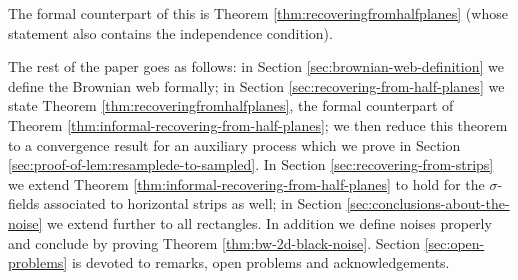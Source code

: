 {The formal counterpart of this is
Theorem \ref{thm:recoveringfromhalfplanes} (whose statement also
contains the independence condition).

The rest of the paper goes as follows: in Section \ref{sec:brownian-web-definition} we define the
Brownian web formally; in Section \ref{sec:recovering-from-half-planes} we state Theorem \ref{thm:recoveringfromhalfplanes}, the formal
counterpart of Theorem \ref{thm:informal-recovering-from-half-planes}; we then reduce this theorem to a
convergence result for an auxiliary process which we prove in Section
\ref{sec:proof-of-lem:resamplede-to-sampled}.  In Section \ref{sec:recovering-from-strips} we extend Theorem \ref{thm:informal-recovering-from-half-planes} to hold for the
$\sigma$-fields associated to horizontal strips as well; in Section \ref{sec:conclusions-about-the-noise}
we extend further to all rectangles.  In addition we define noises
properly and conclude by proving Theorem \ref{thm:bw-2d-black-noise}.  Section \ref{sec:open-problems} is devoted to
remarks, open problems and acknowledgements.
}
